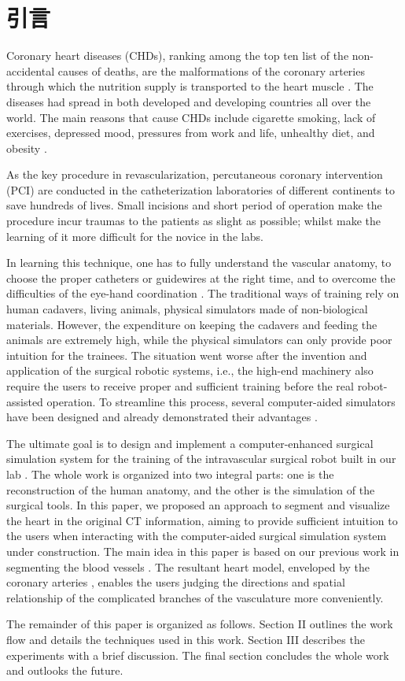 \section{引言}
\label{sec7-1} 

Coronary heart diseases (CHDs), ranking among the top ten list of the non-accidental causes of deaths, are the malformations of the coronary arteries through which the nutrition supply is transported to the heart muscle \cite{WHO2013}. %
The diseases had spread in both developed and developing countries all over the world.
The main reasons that cause CHDs include cigarette smoking, lack of exercises, depressed mood, pressures from work and life, unhealthy diet, and obesity \cite{Go2013}.

As the key procedure in revascularization, percutaneous coronary intervention (PCI) are conducted in the catheterization laboratories of different continents to save hundreds of lives. %
Small incisions and short period of operation make the procedure incur traumas to the patients as slight as possible; whilst make the learning of it more difficult for the novice in the labs. %

In learning this technique, one has to fully understand the vascular anatomy, to choose the proper catheters or guidewires at the right time, and to overcome the difficulties of the eye-hand coordination \cite{Li2012CUHK}. %
The traditional ways of training rely on human cadavers, living animals, physical simulators made of non-biological materials.
However, the expenditure on keeping the cadavers and feeding the animals are extremely high, while the physical simulators can only provide poor intuition for the trainees.
The situation went worse after the invention and application of the surgical robotic systems, i.e., the high-end machinery also require the users to receive proper and sufficient training before the real robot-assisted operation. %
To streamline this process, several computer-aided simulators have been designed and already demonstrated their advantages \cite{Liss2012}.

The ultimate goal is to design and implement a computer-enhanced surgical simulation system for the training of the intravascular surgical robot built in our lab \cite{Ji2011EMBC}.
The whole work is organized into two integral parts: one is the reconstruction of the human anatomy, and the other is the simulation of the surgical tools.
In this paper, we proposed an approach to segment and visualize the heart in the original CT information, aiming to provide sufficient intuition to the users when interacting with the computer-aided surgical simulation system under construction. %
The main idea in this paper is based on our previous work in segmenting the blood vessels \cite{Yang2014ICRA}.
The resultant heart model, enveloped by the coronary arteries \cite{Yang2013ROBIO}, enables the users judging the directions and spatial relationship of the complicated branches of the vasculature more conveniently. %

The remainder of this paper is organized as follows.
Section II outlines the work flow and details the techniques used in this work.
Section III describes the experiments with a brief discussion.
The final section concludes the whole work and outlooks the future.